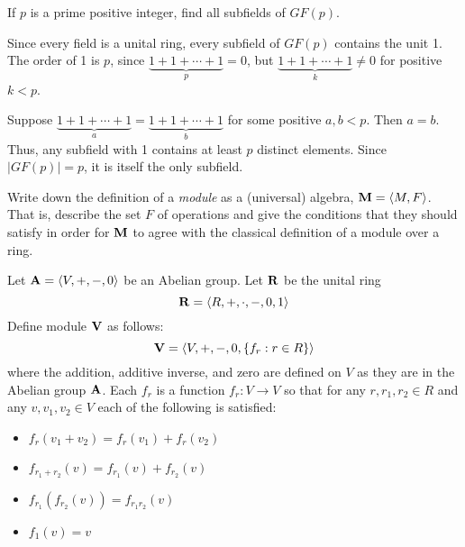 \begin{problem}[Golan 24]
If $p$ is a prime positive integer, find all subfields of $GF(p)$.
\end{problem}

\begin{solution}
Since every field is a unital ring, every subfield of $GF(p)$ contains the unit 1. The order of 1 is $p$, since $\underbrace{1 + 1 + \cdots + 1}_{p} = 0$, but $\underbrace{1 + 1 + \cdots + 1}_{k} \neq 0$ for positive $k<p$.

Suppose  $\underbrace{1 + 1 + \cdots + 1}_{a} = \underbrace{1 + 1 + \cdots + 1}_{b}$ for some positive $a,b <p$. Then $a=b$. Thus, any subfield with 1 contains at least $p$ distinct elements. Since $|GF(p)|=p$, it is itself the only subfield.

\end{solution}
\newpage

\begin{problem}
Write down the definition of a \emph{module} as a (universal) algebra, 
$\mathbf{M} = \langle M, F\rangle$.  That is, describe the set $F$ of operations and 
give the conditions that they should satisfy in order for $\mathbf{M}$ to 
agree with the classical definition of a module over a ring.\\[4pt]
\end{problem}

\begin{solution}
Let $\mathbf{A} = \langle V, +, -, 0\rangle$ be an Abelian group. 
Let $\mathbf{R}$ be the unital ring 
\[\mathbf{R} = \langle R, +, \cdot, -, 0, 1\rangle\]
Define module $\mathbf{V}$ as follows: 
\[\mathbf{V}=\langle V, +, -, 0, \{f_r: r\in R\}\rangle\] 
where the addition, additive inverse, and zero are defined on $V$ as they are in the Abelian group $\mathbf{A}$.
Each $f_r$ is a function $f_r: V\rightarrow V$ so that for any $r, r_1, r_2\in R$ and any $v, v_1, v_2\in V$ each of the following is satisfied: 
	\begin{itemize}
	\item $f_r(v_1+v_2)=f_r(v_1) + f_r(v_2)$
	\item $f_{r_1+r_2}(v) = f_{r_1}(v) + f_{r_2}(v)$
	\item $f_{r_1}\left(f_{r_2}(v)\right) = f_{r_1r_2} (v)$
	\item $f_1(v) = v$
	\end{itemize}
\end{solution}
\probskip



